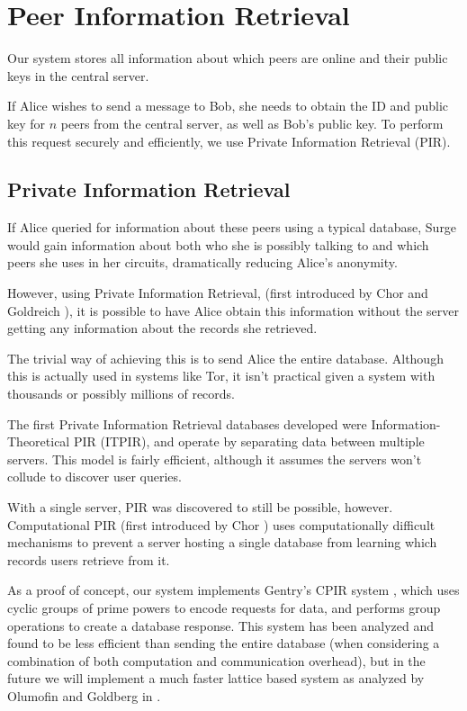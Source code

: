 \documentclass[twocolumn,11pt,english]{article}
\begin{document}
\section{Peer Information Retrieval}
Our system stores all information about which peers are online and their public keys in the central server. 

If Alice wishes to send a message to Bob, she needs to obtain the ID and public key for $n$ peers from the central server, as well as Bob's public key. To perform this request securely and efficiently, we use Private Information Retrieval (PIR).


\subsection{Private Information Retrieval}
  If Alice queried for information about these peers using a typical database, Surge would gain information about both who she is possibly talking to and which peers she uses in her circuits, dramatically reducing Alice's anonymity. 

However, using Private Information Retrieval, (first introduced by Chor and Goldreich \cite{pir}), it is possible to have Alice obtain this information without the server getting any information about the records she retrieved. 

The trivial way of achieving this is to send Alice the entire database. Although this is actually used in systems like Tor, it isn't practical given a system with thousands or possibly millions of records.

The first Private Information Retrieval databases developed were  Information-Theoretical PIR (ITPIR), and operate by separating data between multiple servers. This model is fairly efficient, although it assumes the servers won't collude to discover user queries. 

With a single server, PIR was discovered to still be possible, however. Computational PIR (first introduced by Chor \cite{CPIR}) uses computationally difficult mechanisms to prevent a server hosting a single database from learning which records users retrieve from it. 

As a proof of concept, our system implements Gentry's CPIR system \cite{singledatabaseprivate}, which uses cyclic groups of prime powers to encode requests for data, and performs group operations to create a database response. This system has been analyzed and found to be less efficient than sending the entire database \cite{practicalPIR}(when considering a combination of both computation and communication overhead), but in the future we will implement a much faster lattice based system as analyzed by Olumofin and Goldberg in \cite{practicalPIR}.
\end{document}
